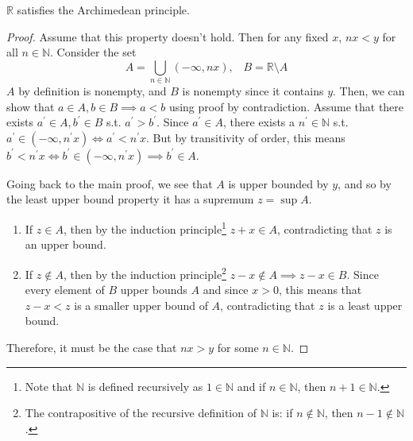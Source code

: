   \begin{theorem}
    $\mathbb{R}$ satisfies the Archimedean principle. 
  \end{theorem}
  \begin{proof}
    Assume that this property doesn't hold. Then for any fixed $x$, $nx < y$ for all $n \in \mathbb{N}$. Consider the set 
    \begin{equation}
      A = \bigcup_{n \in \mathbb{N}} (-\infty, nx), \;\;\; B = \mathbb{R} \setminus A
    \end{equation}
    $A$ by definition is nonempty, and $B$ is nonempty since it contains $y$. Then, we can show that $a \in A, b \in B \implies a < b$ using proof by contradiction. Assume that there exists $a^\prime \in A, b^\prime \in B$ s.t. $a^\prime > b^\prime$. Since $a^\prime \in A$, there exists a $n^\prime \in \mathbb{N}$ s.t. $a^\prime \in (-\infty, n^\prime x) \iff a^\prime < n^\prime x$. But by transitivity of order, this means $b^\prime < n^\prime x \iff b^\prime \in (-\infty, n^\prime x) \implies b^\prime \in A$. 

    Going back to the main proof, we see that $A$ is upper bounded by $y$, and so by the least upper bound property it has a supremum $z = \sup{A}$. 
    \begin{enumerate}
      \item If $z \in A$, then by the induction principle\footnote{Note that $\mathbb{N}$ is defined recursively as $1 \in \mathbb{N}$ and if $n \in \mathbb{N}$, then $n+1 \in \mathbb{N}$. } $z + x \in A$, contradicting that $z$ is an upper bound. 
      \item If $z \not\in A$, then by the induction principle\footnote{The contrapositive of the recursive definition of $\mathbb{N}$ is: if $n \not\in \mathbb{N}$, then $n-1 \not\in \mathbb{N}$.} $z-x \not\in A \implies z-x \in B$. Since every element of $B$ upper bounds $A$ and since $x > 0$, this means that $z-x < z$ is a smaller upper bound of $A$, contradicting that $z$ is a least upper bound. 
    \end{enumerate}
    Therefore, it must be the case that $nx > y$ for some $n \in \mathbb{N}$. 
  \end{proof}
  
